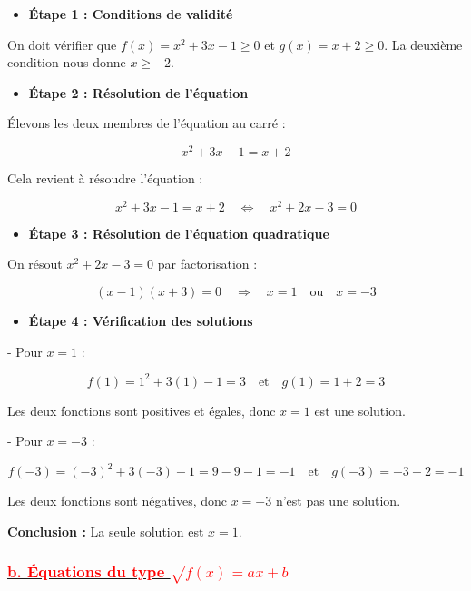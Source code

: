 \documentclass[12pt,a4paper]{article}
\newcounter{solution}
\begin{document}
\begin{itemize}
    \item[•] \textbf{Étape 1 : Conditions de validité}
\end{itemize}

On doit vérifier que \( f(x) = x^2 + 3x - 1 \geq 0 \) et \( g(x) = x + 2 \geq 0 \). La deuxième condition nous donne \( x \geq -2 \).

\begin{itemize}
    \item[•] \textbf{Étape 2 : Résolution de l'équation}
\end{itemize}

Élevons les deux membres de l'équation au carré :

\[
x^2 + 3x - 1 = x + 2
\]

Cela revient à résoudre l'équation :

\[
x^2 + 3x - 1 = x + 2 \quad \Leftrightarrow \quad x^2 + 2x - 3 = 0
\]

\begin{itemize}
    \item[•] \textbf{Étape 3 : Résolution de l'équation quadratique}
\end{itemize}

On résout \( x^2 + 2x - 3 = 0 \) par factorisation :

\[
(x - 1)(x + 3) = 0 \quad \Rightarrow \quad x = 1 \quad \text{ou} \quad x = -3
\]

\begin{itemize}
    \item[•] \textbf{Étape 4 : Vérification des solutions}
\end{itemize}

- Pour \( x = 1 \) :

\[
f(1) = 1^2 + 3(1) - 1 = 3 \quad \text{et} \quad g(1) = 1 + 2 = 3
\]

Les deux fonctions sont positives et égales, donc \( x = 1 \) est une solution.

- Pour \( x = -3 \) :

\[
f(-3) = (-3)^2 + 3(-3) - 1 = 9 - 9 - 1 = -1 \quad \text{et} \quad g(-3) = -3 + 2 = -1
\]

Les deux fonctions sont négatives, donc \( x = -3 \) n'est pas une solution.

\textbf{Conclusion :} La seule solution est \( x = 1 \).

\subsubsection*{\underline{\textbf{\textcolor{red}{b. Équations du type \( \sqrt{f(x)} = ax + b \)}}}}
\end{document}
